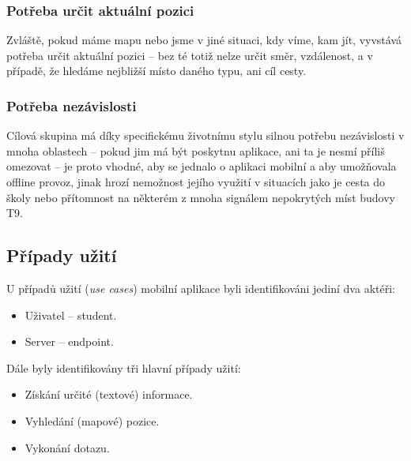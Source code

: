 \subsubsection{Potřeba určit aktuální pozici}
Zvláště, pokud máme mapu nebo jsme v jiné situaci, kdy víme, kam jít, vyvstává potřeba určit aktuální pozici -- bez té totiž nelze určit směr, vzdálenost, a v případě, že hledáme nejbližší místo daného typu, ani cíl cesty.

\subsubsection{Potřeba nezávislosti}
Cílová skupina má díky specifickému životnímu stylu silnou potřebu nezávislosti v mnoha oblastech -- pokud jim má být poskytnu aplikace, ani ta je nesmí příliš omezovat -- je proto vhodné, aby se jednalo o aplikaci mobilní a aby umožňovala offline provoz, jinak hrozí nemožnost jejího využití v situacích jako je cesta do školy nebo přítomnost na některém z mnoha signálem nepokrytých míst budovy T9.

% 


\subsection{Případy užití}
U případů užití (\textit{use cases}) mobilní aplikace byli identifikováni jediní dva aktéři:
\begin{itemize}
 \item Uživatel -- student.
 \item Server --  endpoint.
\end{itemize}
Dále byly identifikovány tři hlavní případy užití:
\begin{itemize}
 \item Získání určité (textové) informace.
 \item Vyhledání (mapové) pozice.
 \item Vykonání  dotazu.
\end{itemize}


